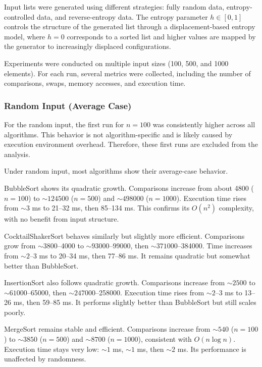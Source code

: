 \documentclass{article}
\begin{document}
Input lists were generated using different strategies: fully random data, entropy-controlled data, and reverse-entropy data. The entropy parameter $h \in [0,1]$ controls the structure of the generated list through a displacement-based entropy model, where $h=0$ corresponds to a sorted list and higher values are mapped by the generator to increasingly displaced configurations.

Experiments were conducted on multiple input sizes (100, 500, and 1000 elements). For each run, several metrics were collected, including the number of comparisons, swaps, memory accesses, and execution time.

\subsubsection{Random Input (Average Case)}

For the random input, the first run for $n=100$ was consistently higher across all algorithms. This behavior is not algorithm-specific and is likely caused by execution environment overhead. Therefore, these first runs are excluded from the analysis.

Under random input, most algorithms show their average-case behavior.

BubbleSort shows its quadratic growth. Comparisons increase from about 4800 ($n=100$) to $\sim 124500$ ($n=500$) and $\sim 498000$ ($n=1000$). Execution time rises from $\sim 3$ ms to 21--32 ms, then 85--134 ms. This confirms its $O(n^2)$ complexity, with no benefit from input structure.

CocktailShakerSort behaves similarly but slightly more efficient. Comparisons grow from $\sim 3800$--4000 to $\sim 93000$--99000, then $\sim 371000$--384000. Time increases from $\sim 2$--3 ms to 20--34 ms, then 77--86 ms. It remains quadratic but somewhat better than BubbleSort.

InsertionSort also follows quadratic growth. Comparisons increase from $\sim 2500$ to $\sim 61000$--65000, then $\sim 247000$--258000. Execution time rises from $\sim 2$--3 ms to 13--26 ms, then 59--85 ms. It performs slightly better than BubbleSort but still scales poorly.

MergeSort remains stable and efficient. Comparisons increase from $\sim 540$ ($n=100$) to $\sim 3850$ ($n=500$) and $\sim 8700$ ($n=1000$), consistent with $O(n \log n)$. Execution time stays very low: $\sim 1$ ms, $\sim 1$ ms, then $\sim 2$ ms. Its performance is unaffected by randomness.
\end{document}
